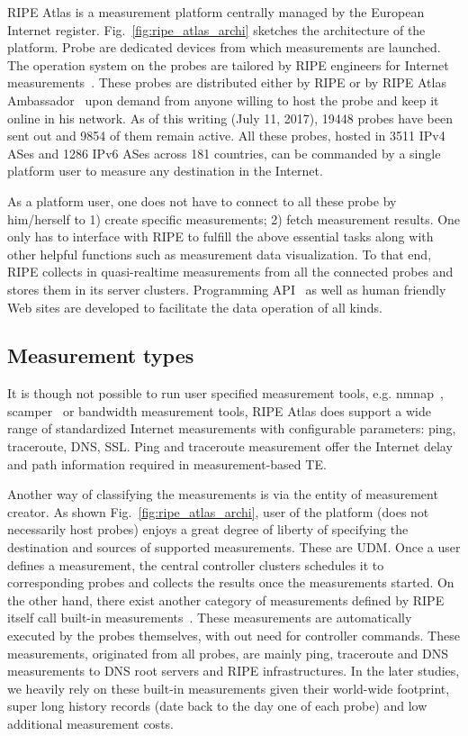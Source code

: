 \acf{RIPE} Atlas is a measurement platform centrally managed by the European Internet register.
Fig.~\ref{fig:ripe_atlas_archi} sketches the architecture of the platform.
Probe are dedicated devices from which measurements are launched.
The operation system on the probes are tailored by RIPE engineers for Internet measurements~\cite{firmware}.
These probes are distributed either by RIPE or by RIPE Atlas Ambassador~\cite{ambassador} upon demand from anyone willing to host the probe and keep it online in his network.
As of this writing (July 11, 2017), 19448 probes have been sent out and 9854 of them remain active.
All these probes, hosted in 3511 IPv4 ASes and 1286 IPv6 ASes across 181 countries, can be commanded by a single platform user to measure any destination in the Internet.

As a platform user, one does not have to connect to all these probe by him/herself to 1) create specific measurements; 2) fetch measurement results. 
One only has to interface with RIPE to fulfill the above essential tasks along with other helpful functions such as measurement data visualization.
To that end, RIPE collects in quasi-realtime measurements from all the connected probes and stores them in its server clusters. Programming API~\cite{atlasapi} as well as human friendly Web sites are developed to facilitate the data operation of all kinds.

\subsection{Measurement types}
It is though not possible to run user specified measurement tools, e.g. nmnap~\cite{nmap}, scamper~\cite{luckie2010scamper} or bandwidth measurement tools, RIPE Atlas does support a wide range of standardized Internet measurements with configurable parameters: ping, traceroute, DNS, SSL.
Ping and traceroute measurement offer the Internet delay and path information required in measurement-based TE.

Another way of classifying the measurements is via the entity of measurement creator. As shown Fig.~\ref{fig:ripe_atlas_archi}, user of the platform (does not necessarily host probes) enjoys a great degree of 
liberty of specifying the destination and sources of supported measurements. These are \acf{UDM}. Once a user defines a measurement, the central controller clusters schedules it to corresponding probes and collects the results once the measurements started.
On the other hand, there exist another category of measurements defined by RIPE itself call built-in measurements~\cite{atlas}. These measurements are automatically executed by the probes themselves, with out need for controller commands. These measurements, originated from all probes, are mainly ping, traceroute and DNS measurements to DNS root servers and RIPE infrastructures.
In the later studies, we heavily rely on these built-in measurements given their world-wide footprint, super long history records (date back to the day one of each probe) and low additional measurement costs.

